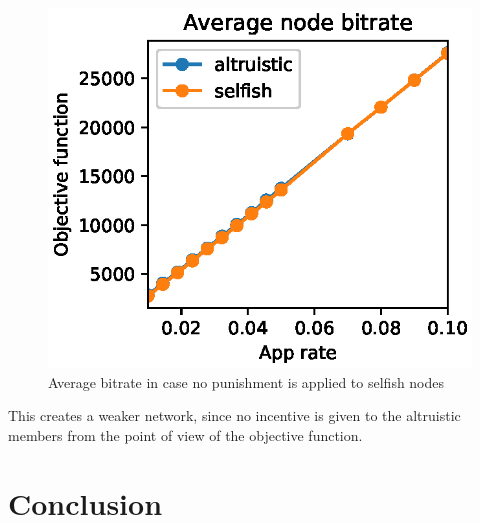 \documentclass[conference]{IEEEtran}
\begin{document}
\begin{figure}
  \includegraphics{figures/obj_func_vs_app_rate_no_punish.eps}
  \caption{Average bitrate in case no punishment is applied to selfish nodes}
  \label{fig:no-blame-app-rate}
\end{figure}

This creates a weaker network, since no incentive is given to the altruistic members from the point of view of the objective function.


\section{Conclusion}


% 
\end{document}
